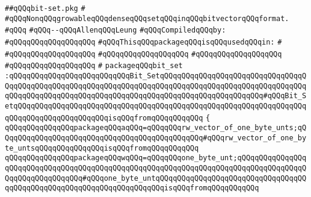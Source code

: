 \label{src/lib/graph/bit-set.pkg}
\verb|##qQQqbit-set.pkg|\newline
\verb|#|\newline
\verb|#qQQqNonqQQqgrowableqQQqdenseqQQqsetqQQqinqQQqbitvectorqQQqformat.|\newline
\verb|#qQQq|\newline
\verb|#qQQq--qQQqAllenqQQqLeung|\newline
\newline
\verb|#qQQqCompiledqQQqby:|\newline
\verb|#qQQqqQQqqQQqqQQqqQQq|\newline
\newline
\verb|#qQQqThisqQQqpackageqQQqisqQQqusedqQQqin:|\newline
\verb|#|\newline
\verb|#qQQqqQQqqQQqqQQqqQQq|\newline
\verb|#qQQqqQQqqQQqqQQqqQQq|\newline
\verb|#qQQqqQQqqQQqqQQqqQQq|\newline
\verb|#qQQqqQQqqQQqqQQqqQQq|\newline
\verb|#|\newline
\verb|packageqQQqbit_set|\newline
\verb|:qQQqqQQqqQQqqQQqqQQqqQQqqQQqBit_SetqQQqqQQqqQQqqQQqqQQqqQQqqQQqqQQqqQQqqQQqqQQqqQQqqQQqqQQqqQQqqQQqqQQqqQQqqQQqqQQqqQQqqQQqqQQqqQQqqQQqqQQqqQQqqQQqqQQqqQQqqQQqqQQqqQQqqQQqqQQqqQQqqQQqqQQqqQQqqQQqqQQq#qQQqBit_SetqQQqqQQqqQQqqQQqqQQqqQQqqQQqqQQqqQQqqQQqqQQqqQQqqQQqqQQqqQQqqQQqqQQqqQQqqQQqqQQqqQQqqQQqqQQqisqQQqfromqQQqqQQqqQQq|\newline
\verb|{|\newline
\verb|qQQqqQQqqQQqqQQqpackageqQQqaqQQq=qQQqqQQqrw_vector_of_one_byte_unts;qQQqqQQqqQQqqQQqqQQqqQQqqQQqqQQqqQQqqQQqqQQqqQQq#qQQqrw_vector_of_one_byte_untsqQQqqQQqqQQqqQQqisqQQqfromqQQqqQQqqQQq|\newline
\verb|qQQqqQQqqQQqqQQqpackageqQQqwqQQq=qQQqqQQqone_byte_unt;qQQqqQQqqQQqqQQqqQQqqQQqqQQqqQQqqQQqqQQqqQQqqQQqqQQqqQQqqQQqqQQqqQQqqQQqqQQqqQQqqQQqqQQqqQQqqQQqqQQqqQQq#qQQqone_byte_untqQQqqQQqqQQqqQQqqQQqqQQqqQQqqQQqqQQqqQQqqQQqqQQqqQQqqQQqqQQqqQQqqQQqqQQqisqQQqfromqQQqqQQqqQQq|\newline

